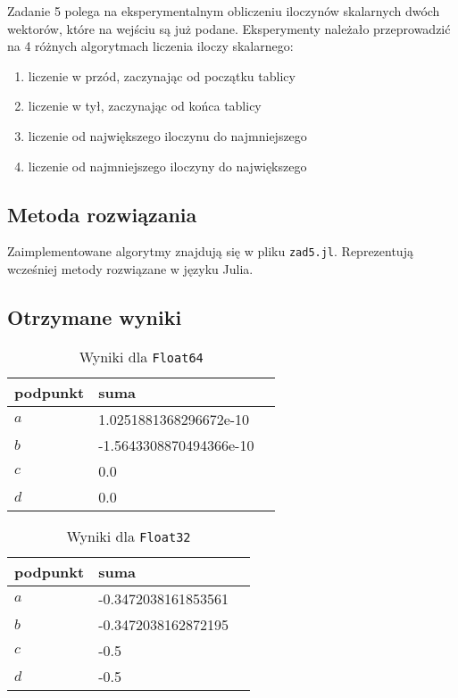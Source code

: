 \documentclass{article}
\begin{document}
Zadanie 5 polega na  eksperymentalnym obliczeniu iloczynów skalarnych dwóch wektorów, które na wejściu są już podane. Eksperymenty należało przeprowadzić na 4 różnych algorytmach liczenia iloczy skalarnego:

\begin{enumerate}[label=(\alph*)]
    \item liczenie w przód, zaczynając od początku tablicy
    \item liczenie w tył, zaczynając od końca tablicy
    \item liczenie od największego iloczynu do najmniejszego
    \item liczenie od najmniejszego iloczyny do największego
\end{enumerate}

\subsection{Metoda rozwiązania}

Zaimplementowane algorytmy znajdują się w pliku \texttt{zad5.jl}. Reprezentują wcześniej metody rozwiązane w języku Julia.

\subsection{Otrzymane wyniki}

\begin{table}[h!]
    \centering
    \begin{tabular}{|l|l|l|}
     \hline
     podpunkt & suma \\
     \hline
     \(a\) & 1.0251881368296672e-10  \\ 
     \(b\) & -1.5643308870494366e-10 \\
     \(c\) & 0.0 \\
     \(d\) & 0.0 \\
     \hline
    \end{tabular}
    \caption{Wyniki dla \texttt{Float64}}
    \label{table:9}
\end{table}

\begin{table}[h!]
    \centering
    \begin{tabular}{|l|l|l|}
     \hline
     podpunkt & suma \\
     \hline
     \(a\) & -0.3472038161853561  \\ 
     \(b\) & -0.3472038162872195 \\
     \(c\) & -0.5 \\
     \(d\) & -0.5 \\
     \hline
    \end{tabular}
    \caption{Wyniki dla \texttt{Float32}}
    \label{table:10}
\end{table}
\end{document}
